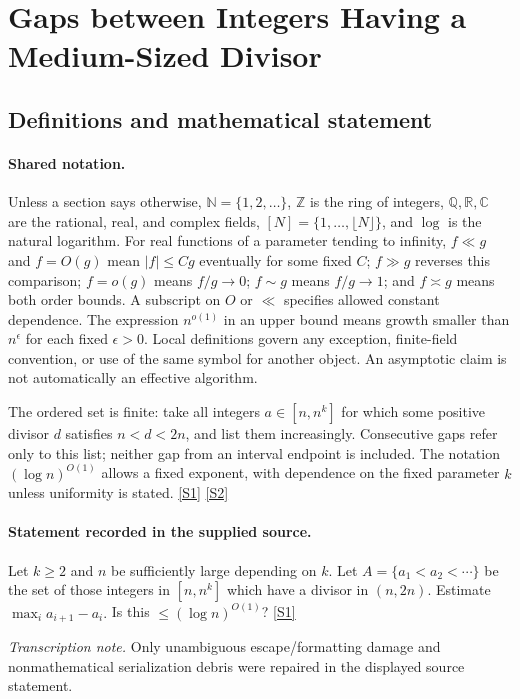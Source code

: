 \documentclass[11pt,a4paper]{article}
\newcommand{\N}{\mathbb{N}}
\newcommand{\Z}{\mathbb{Z}}
\newcommand{\Q}{\mathbb{Q}}
\newcommand{\R}{\mathbb{R}}
\newcommand{\C}{\mathbb{C}}
\newcommand{\sref}[2]{\hyperlink{source:#1:#2}{[S#2]}}
\begin{document}
\section{Gaps between Integers Having a Medium-Sized Divisor}\label{statement}


\subsection{Definitions and mathematical statement}

\paragraph{Shared notation.}Unless a section says otherwise, $\N=\{1,2,\ldots\}$,
$\Z$ is the ring of integers, $\Q,\R,\C$ are the rational, real, and complex
fields, $[N]=\{1,\ldots,\lfloor N\rfloor\}$, and $\log$ is the natural
logarithm. For real functions of a parameter tending to infinity,
$f\ll g$ and $f=O(g)$ mean $|f|\leq Cg$ eventually for some fixed $C$;
$f\gg g$ reverses this comparison; $f=o(g)$ means $f/g\to0$;
$f\sim g$ means $f/g\to1$; and $f\asymp g$ means both order bounds.
A subscript on $O$ or $\ll$ specifies allowed constant dependence.
The expression $n^{o(1)}$ in an upper bound means growth smaller than
$n^\epsilon$ for each fixed $\epsilon>0$. Local definitions govern any
exception, finite-field convention, or use of the same symbol for another
object. An asymptotic claim is not automatically an effective algorithm.



The ordered set is finite: take all integers $a\in[n,n^k]$ for which some positive divisor $d$ satisfies $n<d<2n$, and list them increasingly. Consecutive gaps refer only to this list; neither gap from an interval endpoint is included. The notation $(\log n)^{O(1)}$ allows a fixed exponent, with dependence on the fixed parameter $k$ unless uniformity is stated. \sref{statement}{1} \sref{statement}{2}

\paragraph{Statement recorded in the supplied source.}
Let $k\geq 2$ and $n$ be sufficiently large depending on $k$. Let $A=\{a_1<a_2<\cdots \}$ be the set of those integers in $[n,n^k]$ which have a divisor in $(n,2n)$. Estimate $ \max_{i} a_{i+1}-a_i. $ Is this $\leq (\log n)^{O(1)}$? \sref{statement}{1}

{\small\emph{Transcription note.} Only unambiguous escape/formatting damage and nonmathematical serialization debris were repaired in the displayed source statement.}
\end{document}
